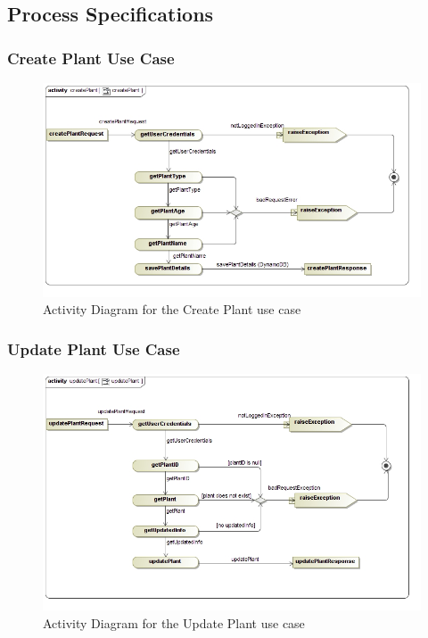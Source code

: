\documentclass{article}
\begin{document}
	\subsection{Process Specifications}
		\subsubsection{Create Plant Use Case}
			\begin{figure}[H]
				\includegraphics[width=\linewidth]{createPlant.jpg}
				\caption{Activity Diagram for the Create Plant use case}
			\end{figure}
	\newpage
		\subsubsection{Update Plant Use Case}
			\begin{figure}[H]
				\includegraphics[width=\linewidth]{updatePlant.jpg}
				\caption{Activity Diagram for the Update Plant use case}
			\end{figure}
	\newpage
\end{document}
